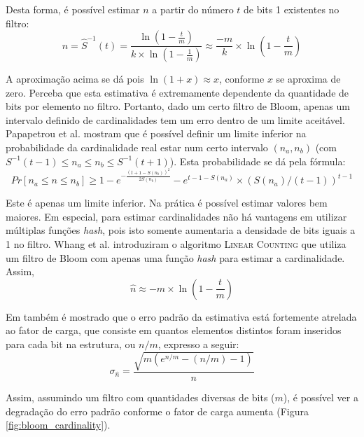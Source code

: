 Desta forma, é possível estimar $n$ a partir do número $t$ de bits 1 existentes no filtro:
\[
n = \hat{S}^{-1}(t) = \frac{\ln \left( 1 - \frac{t}{m} \right)}{k \times \ln \left( 1 - \frac{1}{m} \right)} \approx \frac{-m}{k} \times \ln \left( 1-\frac{t}{m} \right)
\]

A aproximação acima se dá pois $\ln(1 + x) \approx x$, conforme $x$ se aproxima de zero. Perceba que esta estimativa é extremamente dependente da quantidade de bits por elemento no filtro. Portanto, dado um certo filtro de Bloom, apenas um intervalo definido de cardinalidades tem um erro dentro de um limite aceitável. Papapetrou et al. \cite{papapetrou2010cardinality} mostram que é possível definir um limite inferior na probabilidade da cardinalidade real estar num certo intervalo $(n_a, n_b)$ (com $S^{-1}(t-1) \leq n_a \leq n_b \leq S^{-1}(t+1)$). Esta probabilidade se dá pela fórmula:
\[
Pr[n_a \leq n \leq n_b] \geq 1 - e^{-\frac{(t+1-S(n_b))^2}{2S(n_b)}} - e^{t-1-S(n_a)} \times \left( S(n_a) / (t-1) \right)^{t-1}
\]

Este é apenas um limite inferior. Na prática é possível estimar valores bem maiores. Em especial, para estimar cardinalidades não há vantagens em utilizar múltiplas funções \emph{hash}, pois isto somente aumentaria a densidade de bits iguais a 1 no filtro. Whang et al. introduziram o algoritmo \textsc{Linear Counting} \cite{whang1990linear} que utiliza um filtro de Bloom com apenas uma função \emph{hash} para estimar a cardinalidade. Assim,
\[
\hat{n} \approx -m \times \ln \left( 1-\frac{t}{m} \right)
\]

Em  \cite{whang1990linear} também é mostrado que o erro padrão da estimativa está fortemente atrelada ao fator de carga, que consiste em quantos elementos distintos foram inseridos para cada bit na estrutura, ou $n/m$, expresso a seguir:
\[
\sigma_{\hat{n}} = \frac{\sqrt{m(e^{n/m} - (n/m) - 1)}}{n}
\]

Assim, assumindo um filtro com quantidades diversas de bits ($m$), é possível ver a degradação do erro padrão conforme o fator de carga aumenta (Figura \ref{fig:bloom_cardinality}).

